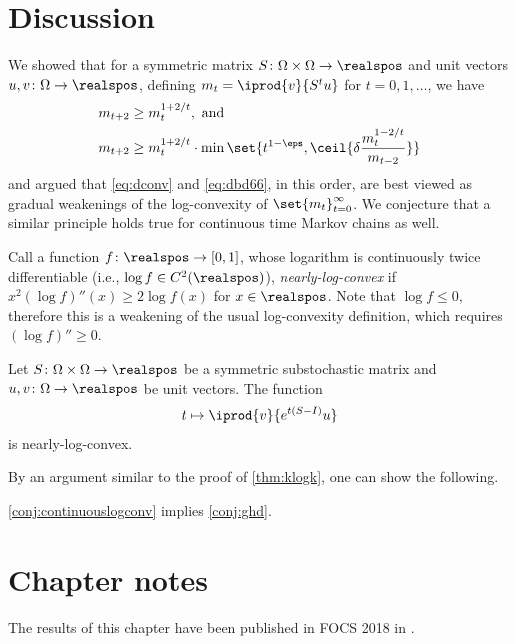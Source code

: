 \section{Discussion}
\label{sec:ham:discussion}
We showed that for a symmetric matrix 
$S\colon\Omega\times\Omega\to\realspos$ and 
unit vectors $u,v\colon\Omega\to\realspos$, defining
$m_t = \iprod{v}{S^tu}$ for $t=0,1,\ldots$, we have 
\begin{align}
m_{t+2}    &\ge m_t^{1+2/t}, \text{ and}\label{eq:dbd66}\\
m_{t+2}    &\ge m_t^{1+2/t}\cdot \min\set{t^{1-\eps}, 
\ceil{\delta\frac{m_t^{1-2/t}}{m_{t-2}}}} \label{eq:dconv}
\end{align}
and argued that \autoref{eq:dconv} and \eqref{eq:dbd66}, 
in this order, are best viewed as gradual weakenings of
the log-convexity of $\set{m_t}_{t=0}^\infty$.
We conjecture that a similar principle holds
true for continuous time Markov chains as well.

Call a function $f\colon\realspos\to[0,1]$,
whose logarithm is continuously twice differentiable 
(i.e., $\log f\in C^2(\realspos)$), {\em nearly-log-convex} 
if $x^2 (\log f)''(x)\ge 2 \log f(x)$ for $x\in\realspos$. 
Note that $\log f \le 0$, therefore this is a weakening
of the usual log-convexity definition, which requires 
$(\log f)''\ge 0$.

\begin{conjecture}
\label{conj:continuouslogconv}
Let $S\colon\Omega\times\Omega\to\realspos$
be a symmetric substochastic matrix and $u,v\colon\Omega\to\realspos$
be unit vectors. The function
\begin{align*}
t\mapsto \iprod{v}{e^{t(S-I)}u}
\end{align*}
is nearly-log-convex.
\end{conjecture}
By an argument similar to the proof of \autoref{thm:klogk}, one can 
show the following.
\begin{theorem}
\autoref{conj:continuouslogconv} implies \autoref{conj:ghd}.
\end{theorem}

\section{Chapter notes}
\label{ham:notes}
The results of this chapter have been published in FOCS 2018 in \cite{Saglam2018}.